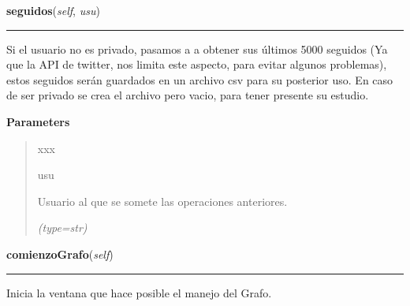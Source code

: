     \label{funcionesTwitter:FuncionesTwitter:seguidos}

    \vspace{0.5ex}

\hspace{.8\funcindent}\begin{boxedminipage}{\funcwidth}

    \raggedright \textbf{seguidos}(\textit{self}, \textit{usu})

    \vspace{-1.5ex}

    \rule{\textwidth}{0.5\fboxrule}
\setlength{\parskip}{2ex}
    Si el usuario no es privado, pasamos a a obtener sus últimos 5000 
    seguidos (Ya que la API de twitter, nos limita este aspecto, para 
    evitar algunos problemas), estos seguidos serán guardados en un archivo
    csv para su posterior uso. En caso de ser privado se crea el archivo 
    pero vacio, para tener presente su estudio.

\setlength{\parskip}{1ex}
      \textbf{Parameters}
      \vspace{-1ex}

      \begin{quote}
        \begin{Ventry}{xxx}

          \item[usu]

          Usuario al que se somete las operaciones anteriores.

            {\it (type=str)}

        \end{Ventry}

      \end{quote}

    \end{boxedminipage}

    \label{funcionesTwitter:FuncionesTwitter:comienzoGrafo}

    \vspace{0.5ex}

\hspace{.8\funcindent}\begin{boxedminipage}{\funcwidth}

    \raggedright \textbf{comienzoGrafo}(\textit{self})

    \vspace{-1.5ex}

    \rule{\textwidth}{0.5\fboxrule}
\setlength{\parskip}{2ex}
    Inicia la ventana que hace posible el manejo del Grafo.

\setlength{\parskip}{1ex}
    \end{boxedminipage}

